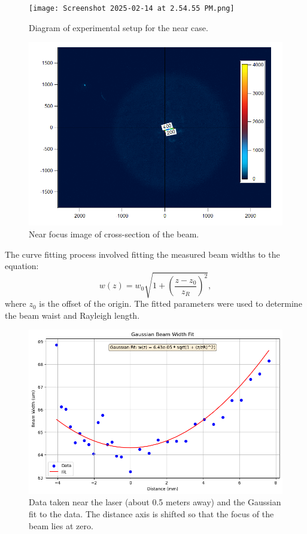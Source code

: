 \documentclass[12pt]{article}
\begin{document}
\begin{figure}[H]
    \centering
    \texttt{[image: Screenshot 2025-02-14 at 2.54.55 PM.png]}
    \caption{Diagram of experimental setup for the near case.}
    \label{fig:near-setup}
\end{figure}

\begin{figure}[H]
    \centering
    \includegraphics[width=1\linewidth]{TIF to PNG Focus (1).png}
    \caption{Near focus image of cross-section of the beam.}
    \label{fig:near-focus}
\end{figure}

The curve fitting process involved fitting the measured beam widths to the equation:
\[
w(z) = w_0 \sqrt{1 + \left(\frac{z - z_0}{z_R}\right)^2},
\]
where \(z_0\) is the offset of the origin. The fitted parameters were used to determine the beam waist and Rayleigh length.

\begin{figure}[H]
    \centering
    \includegraphics[width=1\linewidth]{near_fit.png}
    \caption{Data taken near the laser (about 0.5 meters away) and the Gaussian fit to the data. The distance axis is shifted so that the focus of the beam lies at zero.}
    \label{fig:near-fit}
\end{figure}
\end{document}
